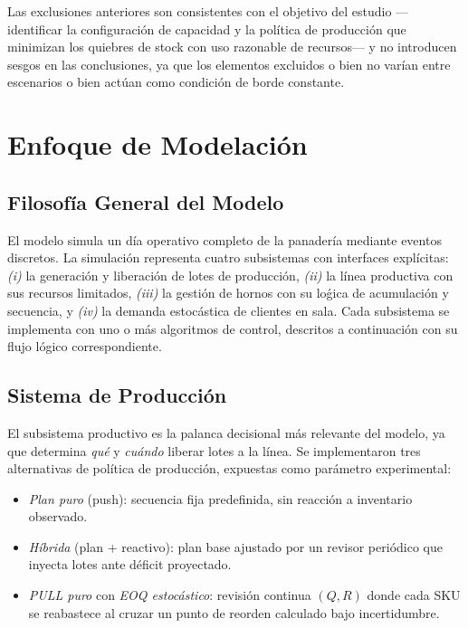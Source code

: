 \documentclass[10pt, a4paper]{article}
\begin{document}
Las exclusiones anteriores son consistentes con el objetivo del estudio ---
identificar la configuraci\'on de capacidad y la pol\'itica de producci\'on
que minimizan los quiebres de stock con uso razonable de recursos--- y no
introducen sesgos en las conclusiones, ya que los elementos excluidos o bien
no var\'ian entre escenarios o bien act\'uan como condici\'on de borde
constante.

\newpage

\section{Enfoque de Modelaci\'on}
\label{sec:enfoque}

\subsection{Filosof\'ia General del Modelo}

El modelo simula un d\'ia operativo completo de la panader\'ia mediante eventos
discretos. La simulaci\'on representa cuatro subsistemas con interfaces
expl\'icitas: \emph{(i)} la generaci\'on y liberaci\'on de lotes de producci\'on,
\emph{(ii)} la l\'inea productiva con sus recursos limitados,
\emph{(iii)} la gesti\'on de hornos con su lo\'gica de acumulaci\'on y secuencia,
y \emph{(iv)} la demanda estoc\'astica de clientes en sala. Cada subsistema se
implementa con uno o m\'as algoritmos de control, descritos a continuaci\'on con
su flujo l\'ogico correspondiente.

\subsection{Sistema de Producci\'on}

El subsistema productivo es la palanca decisional m\'as relevante del modelo,
ya que determina \emph{qu\'e} y \emph{cu\'ando} liberar lotes a la l\'inea.
Se implementaron tres alternativas de pol\'itica de producci\'on, expuestas
como par\'ametro experimental:

\begin{itemize}
  \item \textit{Plan puro} (push): secuencia fija predefinida, sin reacci\'on
    a inventario observado.
  \item \textit{H\'ibrida} (plan + reactivo): plan base ajustado por un
    revisor peri\'odico que inyecta lotes ante d\'eficit proyectado.
  \item \textit{PULL puro} con \textit{EOQ estoc\'astico}: revisi\'on
    continua $(Q,R)$ donde cada SKU se reabastece al cruzar un punto de
    reorden calculado bajo incertidumbre.
\end{itemize}
\end{document}
